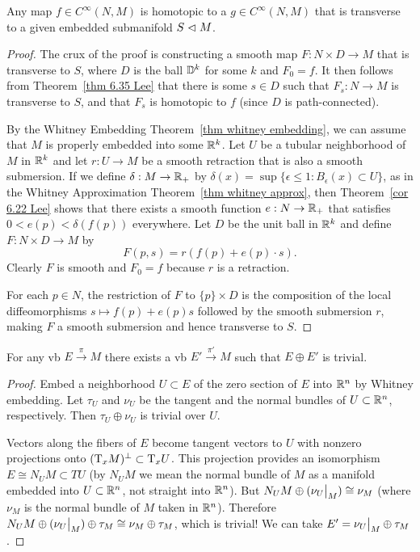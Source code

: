 \begin{thm}\label{transverse homotopy thm}
Any map $f\in C^\infty(N,M)$ is homotopic to a $g\in C^\infty(N,M)$ that is transverse to a given embedded submanifold $S\vartriangleleft M$.
\end{thm}
\begin{proof}
The crux of the proof is constructing a smooth map $F:N\times D\to M$ that is transverse to $S$, where $D$ is the ball $\mathbb{D}^k$ for some $k$ and $F_0=f$. It then follows from Theorem~\ref{thm 6.35 Lee} that there is some $s\in D$ such that $F_s:N\to M$ is transverse to $S$, and that $F_s$ is homotopic to $f$ (since $D$ is path-connected).

By the Whitney Embedding Theorem~\ref{thm whitney embedding}, we can assume that $M$ is properly embedded into some $\mathbb{R}^k$. Let $U$ be a tubular neighborhood of $M$ in $\mathbb{R}^k$ and let $r:U\to M$ be a smooth retraction that is also a smooth submersion. If we define $\delta:M\to \mathbb{R}_+$ by $\delta(x)=\sup\{\epsilon\leq 1:B_\epsilon(x)\subset U\}$, as in the Whitney Approximation Theorem~\ref{thm whitney approx}, then Theorem~\ref{cor 6.22 Lee} shows that there exists a smooth function $e:N\to \mathbb{R}_+$ that satisfies $0<e(p)<\delta(f(p))$ everywhere. Let $D$ be the unit ball in $\mathbb{R}^k$ and define $F:N\times D\to M$ by
\[F(p,s)=r(f(p)+e(p)\cdot s).\]
Clearly  $F$ is smooth and $F_0=f$ because $r$ is a retraction. 

For each $p\in N$, the restriction of $F$ to $\{p\}\times D$ is the composition of the local diffeomorphisms $s\mapsto f(p)+e(p)s$ followed by the smooth submersion $r$, making $F$ a smooth submersion and hence transverse to $S$.
\end{proof}


\begin{thm}\label{every VB is summand of trivial VB}
    For any \gls{vb} $E\overset{\pi}{\to} M$ there exists a \gls{vb} $E'\overset{\pi'}{\to} M$ such that $E\oplus E'$ is trivial.
\end{thm}
\begin{proof}
    Embed a neighborhood $U\subset E$ of the zero section of $E$ into $\mathbb{R}^n$ by Whitney embedding. Let $\tau_U$ and $\nu_U$ be the tangent and the normal bundles of $U\subset \mathbb{R}^n$, respectively. Then $\tau_U\oplus \nu_U$ is trivial over $U$.
    
    Vectors along the fibers of $E$ become tangent vectors to $U$ with nonzero projections onto $(\mathrm{T}_x M)^\perp\subset \mathrm{T}_x U$. This projection provides an isomorphism $E\cong N_U M\subset TU$ (by $N_U M$ we mean the normal bundle of $M$ as a manifold embedded into $U\subset \mathbb{R}^n$, not straight into $\mathbb{R}^n$). But $N_U M\oplus (\restr{\nu_U}{M})\cong \nu_M$ (where $\nu_M$ is the normal bundle of $M$ taken in $\mathbb{R}^n$). Therefore $N_U M\oplus (\restr{\nu_U}{M})\oplus \tau_M\cong \nu_M\oplus \tau_M $, which is trivial! We can take $E'=\restr{\nu_U}{M}\oplus \tau_M$.
\end{proof}

